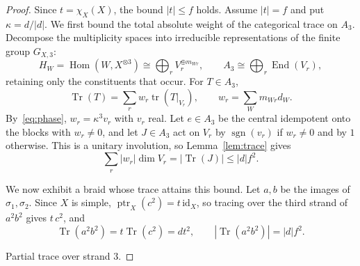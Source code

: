 \documentclass[11pt,oneside]{amsart}
\theoremstyle{remark}
\newcommand{\Tr}{\operatorname{Tr}}
\newcommand{\tr}{\operatorname{tr}}
\newcommand{\ptr}{\operatorname{ptr}}
\newcommand{\Hom}{\operatorname{Hom}}
\newcommand{\End}{\operatorname{End}}
\newcommand{\sgn}{\operatorname{sgn}}
\newcommand{\id}{\mathrm{id}}
\newcommand{\crossing}[2]{%
  \draw (#1+1,#2) .. controls (#1+1,#2+0.5) and (#1,#2+0.5) .. (#1,#2+1);
  \draw[white,line width=3.2pt] (#1,#2) .. controls (#1,#2+0.5) and (#1+1,#2+0.5) .. (#1+1,#2+1);
  \draw (#1,#2) .. controls (#1,#2+0.5) and (#1+1,#2+0.5) .. (#1+1,#2+1);}
\begin{document}
\begin{proof}
Since $t=\chi_X(X)$, the bound $|t|\le f$ holds. Assume $|t|=f$ and put
$\kappa=d/|d|$. We first bound the total absolute weight of the categorical
trace on $A_3$. Decompose the multiplicity spaces into irreducible
representations of the finite group $G_{X,3}$:
\[
H_W=\Hom(W,X^{\otimes3})\cong\bigoplus_rV_r^{\oplus m_{Wr}},\qquad
A_3\cong\bigoplus_r\End(V_r),
\]
retaining only the constituents that occur. For $T\in A_3$,
\[
\Tr(T)=\sum_rw_r\tr(T|_{V_r}),\qquad w_r=\sum_Wm_{Wr}d_W .
\]
By~\eqref{eq:phase}, $w_r=\kappa^3v_r$ with $v_r$ real. Let $e\in A_3$ be the
central idempotent onto the blocks with $w_r\ne0$, and let $J\in A_3$ act on
$V_r$ by $\sgn(v_r)$ if $w_r\ne0$ and by $1$ otherwise. This is a unitary
involution, so Lemma~\ref{lem:trace} gives
\begin{equation}\label{eq:J}
\sum_r|w_r|\dim V_r=|\Tr(J)|\le|d|f^2.
\end{equation}

\noindent\begin{minipage}[t]{0.6\textwidth}
\setlength{\parindent}{1em}\indent
We now exhibit a braid whose trace attains this bound. Let $a,b$ be the
images of $\sigma_1,\sigma_2$. Since $X$ is simple, $\ptr_X(c^2)=t\,\id_X$, so
tracing over the third strand of $a^2b^2$ gives $t\,c^2$, and
\[
\Tr(a^2b^2)=t\Tr(c^2)=dt^2,\qquad |\Tr(a^2b^2)|=|d|f^2.
\]
\end{minipage}\hfill
\begin{minipage}[t]{0.37\textwidth}
\vspace{-4pt}
\centering
{}

\vspace{1pt}
{\footnotesize Partial trace over strand 3.}
\end{minipage}


\end{proof}
\end{document}
